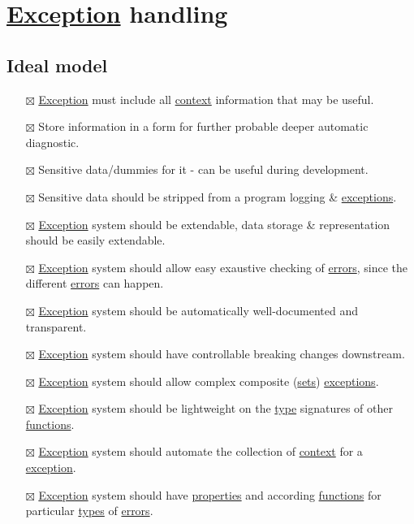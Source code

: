 \documentclass[a4paper,14pt,oneside]{book}
\begin{document}
\chapter{\hyperref[orgc6c2b0b]{Exception} handling}
\label{sec:orgd543412}

\section{Ideal model}
\label{sec:org9b9eb4b}

\begin{itemize}
\item[{$\boxtimes$}] \hyperref[orgc6c2b0b]{Exception} must include all \hyperref[orgdc64acc]{context} information that may be useful.
\item[{$\boxtimes$}] Store information in a form for further probable deeper automatic diagnostic.
\item[{$\boxtimes$}] Sensitive data/dummies for it - can be useful during development.
\item[{$\boxtimes$}] Sensitive data should be stripped from a program logging \& \hyperref[org91c0ee8]{exceptions}.
\item[{$\boxtimes$}] \hyperref[orgc6c2b0b]{Exception} system should be extendable, data storage \& representation should be easily extendable.
\item[{$\boxtimes$}] \hyperref[orgc6c2b0b]{Exception} system should allow easy exaustive checking of \hyperref[org11ef23f]{errors}, since the different \hyperref[org11ef23f]{errors} can happen.
\item[{$\boxtimes$}] \hyperref[orgc6c2b0b]{Exception} system should be automatically well-documented and transparent.
\item[{$\boxtimes$}] \hyperref[orgc6c2b0b]{Exception} system should have controllable breaking changes downstream.
\item[{$\boxtimes$}] \hyperref[orgc6c2b0b]{Exception} system should allow complex composite (\hyperref[orgcc1d99f]{sets}) \hyperref[org91c0ee8]{exceptions}.
\item[{$\boxtimes$}] \hyperref[orgc6c2b0b]{Exception} system should be lightweight on the \hyperref[org7c4e373]{type} signatures of other \hyperref[orgfb1e17f]{functions}.
\item[{$\boxtimes$}] \hyperref[orgc6c2b0b]{Exception} system should automate the collection of \hyperref[orgdc64acc]{context} for a \hyperref[orgc6c2b0b]{exception}.
\item[{$\boxtimes$}] \hyperref[orgc6c2b0b]{Exception} system should have \hyperref[org3947d55]{properties} and according \hyperref[orgfb1e17f]{functions} for particular \hyperref[org5a18391]{types} of \hyperref[org11ef23f]{errors}.
\end{itemize}
\end{document}
